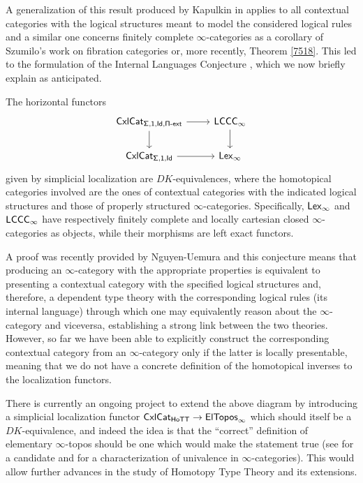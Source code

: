 \noindent
A generalization of this result produced by Kapulkin in \cite{Kap17}
applies to all contextual categories with the
logical structures meant to model the considered logical rules and a similar one
concerns finitely complete $\infty$-categories as a corollary of Szumilo's
work on fibration categories \cite{Szu14} or, more recently, Theorem \ref{7518}.
This led to the formulation of the Internal Languages Conjecture \cite[Conj.\
3.7]{KL16}, which we now briefly explain as anticipated.

\begin{named}\label{intlang}
  The horizontal functors
  \[\begin{tikzcd}
    {\Cxl_{\Sigmas,\mathsf{1},\Ids,\Piext}} & \LCCCi \\
    {\Cxl_{\Sigmas,\mathsf{1},\Ids}} & \Lexi
    \arrow[from=2-1, to=2-2]
    \arrow[from=1-2, to=2-2]
    \arrow[from=1-1, to=2-1]
    \arrow[from=1-1, to=1-2]
  \end{tikzcd}\]
  given by simplicial localization are $DK$-equivalences, where the homotopical
  categories involved are the ones of contextual categories with the indicated
  logical structures and those of properly structured $\infty$-categories.
  Specifically, $\operatorname{\mathsf{Lex}_\infty}$ and $\operatorname{\mathsf{LCCC}_\infty}$ have respectively finitely complete and
  locally cartesian closed $\infty$-categories as objects, while their morphisms
  are left exact functors.
\end{named}

\noindent
A proof was recently provided by Nguyen-Uemura \cite{NU22} and this
conjecture means that producing an $\infty$-category with the appropriate
properties is equivalent to presenting a contextual category with the specified
logical structures and, therefore, a dependent type theory with the
corresponding logical rules (its internal language) through which
one may equivalently reason about the $\infty$-category and viceversa,
establishing a strong link between the two theories.
However, so far we have been able to explicitly construct the corresponding
contextual category from an $\infty$-category only if the latter is locally
presentable, meaning that we do not have a concrete definition of the
homotopical inverses to the localization functors.

\noindent
There is currently an ongoing project to 
extend the above diagram by introducing a simplicial localization
functor $\operatorname{\mathsf{CxlCat}}_{\mathsf{HoTT}}\rightarrow\operatorname{\mathsf{ElTopos}_\infty}$ which should itself be a
$DK$-equivalence, and indeed the idea is that the ``correct'' definition of
elementary $\infty$-topos should be one which would make the statement true (see
\cite{Ras18} for a candidate and \cite{Ras21} for a characterization of
univalence in $\infty$-categories). This would allow further advances in the
study of Homotopy Type Theory and its extensions.

